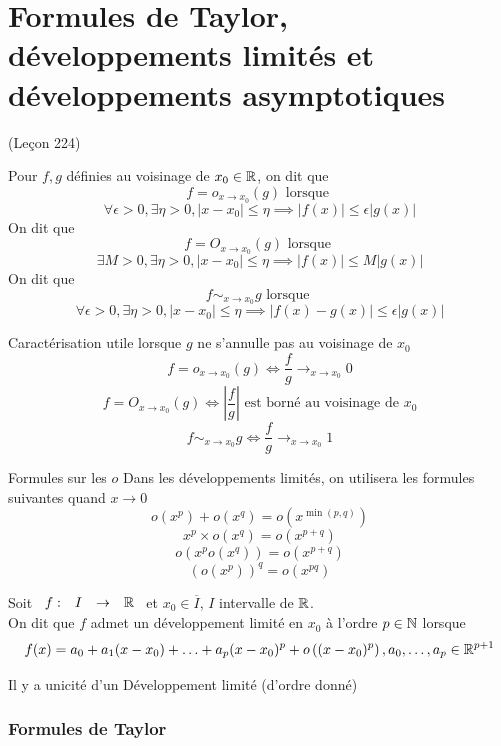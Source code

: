 \documentclass[]{report}
\begin{document}
\chapter{Formules de Taylor, développements limités et développements asymptotiques}
(Leçon 224)

Pour $f,g$ définies au voisinage de $x_0\in \mathbb{R}$, on dit que
\[f= o_{x\to x_0} (g)\text{ lorsque }\]
\[\forall \epsilon>0,\exists \eta>0, \left|x-x_0\right|\le \eta \implies \left|f(x)\right| \le \epsilon \left|g(x)\right|\]
On dit que
\[f= O_{x\to x_0} (g)\text{ lorsque }\]
\[\exists M>0,\exists \eta>0, \left|x-x_0\right|\le \eta \implies \left|f(x)\right| \le M \left|g(x)\right|\]
On dit que
\[f \sim_{x\to x_0} g\text{ lorsque }\]
\[\forall \epsilon>0,\exists \eta>0, \left|x-x_0\right|\le \eta \implies \left|f(x)-g(x)\right| \le \epsilon \left|g(x)\right|\]

\begin{prop}{Caractérisation utile lorsque $g$ ne s'annulle pas au voisinage de $x_0$}{}
    \[f= o_{x\to x_0} (g) \iff \frac{f}{g}\longrightarrow_{x\to x_0}0\]
    \[f= O_{x\to x_0} (g)\iff \left|\frac{f}{g}\right|\text{ est borné au voisinage de $x_0$} \]
    \[f \sim_{x\to x_0} g \iff \frac{f}{g}\longrightarrow_{x\to x_0}1\]
\end{prop}

\begin{prop}{Formules sur les $o$}{}
    Dans les développements limités, on utilisera les formules suivantes quand $x\to 0$
    \[o(x^p)+o(x^q)=o(x^{\min(p,q)})\]
    \[x^p \times o(x^q)=o(x^{p+q})\]
    \[o(x^p o(x^q))=o(x^{p+q})\]
    \[\left( o(x^p)\right)^q= o(x^{pq})\]
\end{prop}

\begin{df}{}{}
    Soit $\begin{array}{ccccc} f : & I & \to & \mathbb{R} \end{array}$ et $x_0\in \overline{I}$, $I$ intervalle de $\mathbb{R}$.\\
    On dit que $f$ admet un développement limité en $x_0$ à l'ordre $p\in \mathbb{N}$ lorsque
    \[f(x)=a_0+a_1(x-x_0)+\ldots+ a_p (x-x_0)^p +o\left((x-x_0)^p\right),a_0,\ldots,a_p\in \mathbb{R}^{p+1}\]
\end{df}

\begin{re}{}{}
    Il y a unicité d'un Développement limité (d'ordre donné)
\end{re}

\subsection*{Formules de Taylor}
\end{document}
